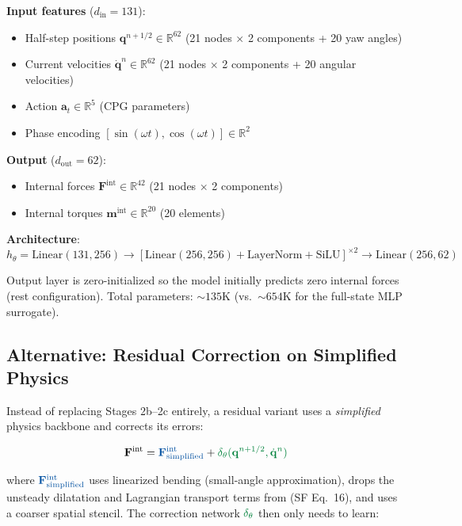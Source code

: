 \documentclass[11pt]{article}
\newcommand{\vect}[1]{\mathbf{#1}}
\newcommand{\Real}{\mathbb{R}}
\newcommand{\phys}[1]{{\color{physicsblue}#1}}
\newcommand{\nn}[1]{{\color{nngreen}#1}}
\begin{document}
\noindent
\textbf{Input features} ($d_{\text{in}} = 131$):
\begin{itemize}
  \item Half-step positions $\vect{q}^{n+1/2} \in \Real^{62}$ (21 nodes $\times$ 2 components + 20 yaw angles)
  \item Current velocities $\dot{\vect{q}}^n \in \Real^{62}$ (21 nodes $\times$ 2 components + 20 angular velocities)
  \item Action $\vect{a}_t \in \Real^5$ (CPG parameters)
  \item Phase encoding $[\sin(\omega t), \cos(\omega t)] \in \Real^2$
\end{itemize}

\noindent
\textbf{Output} ($d_{\text{out}} = 62$):
\begin{itemize}
  \item Internal forces $\vect{F}^{\text{int}} \in \Real^{42}$ (21 nodes $\times$ 2 components)
  \item Internal torques $\vect{m}^{\text{int}} \in \Real^{20}$ (20 elements)
\end{itemize}

\noindent
\textbf{Architecture}:
\begin{equation}
  h_\theta = \text{Linear}(131, 256) \to [\text{Linear}(256, 256) + \text{LayerNorm} + \text{SiLU}]^{\times 2} \to \text{Linear}(256, 62)
  \label{eq:nn-arch}
\end{equation}

\noindent
Output layer is zero-initialized so the model initially predicts zero internal forces (rest configuration).
Total parameters: ${\sim}135$K (vs.\ ${\sim}654$K for the full-state MLP surrogate).


\subsection{Alternative: Residual Correction on Simplified Physics}

Instead of replacing Stages 2b--2c entirely, a residual variant uses a \emph{simplified} physics backbone and corrects its errors:

\begin{equation}
  \vect{F}^{\text{int}} = \phys{\vect{F}^{\text{int}}_{\text{simplified}}} + \nn{\delta_\theta(\vect{q}^{n+1/2}, \dot{\vect{q}}^n)}
  \label{eq:residual}
\end{equation}

\noindent
where $\phys{\vect{F}^{\text{int}}_{\text{simplified}}}$ uses linearized bending (small-angle approximation), drops the unsteady dilatation and Lagrangian transport terms from (SF Eq.~16), and uses a coarser spatial stencil.
The correction network $\nn{\delta_\theta}$ then only needs to learn:
\end{document}
